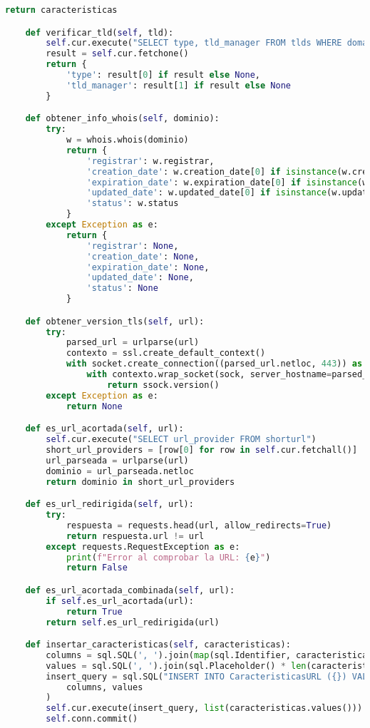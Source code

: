 \documentclass{article}
\begin{document}
\begin{lstlisting}[language=Python, caption=Clase para extraer características de URLs]
        return caracteristicas

    def verificar_tld(self, tld):
        self.cur.execute("SELECT type, tld_manager FROM tlds WHERE domain = %s", ('.' + tld,))
        result = self.cur.fetchone()
        return {
            'type': result[0] if result else None,
            'tld_manager': result[1] if result else None
        }

    def obtener_info_whois(self, dominio):
        try:
            w = whois.whois(dominio)
            return {
                'registrar': w.registrar,
                'creation_date': w.creation_date[0] if isinstance(w.creation_date, list) else w.creation_date,
                'expiration_date': w.expiration_date[0] if isinstance(w.expiration_date, list) else w.expiration_date,
                'updated_date': w.updated_date[0] if isinstance(w.updated_date, list) else w.updated_date,
                'status': w.status
            }
        except Exception as e:
            return {
                'registrar': None,
                'creation_date': None,
                'expiration_date': None,
                'updated_date': None,
                'status': None
            }

    def obtener_version_tls(self, url):
        try:
            parsed_url = urlparse(url)
            contexto = ssl.create_default_context()
            with socket.create_connection((parsed_url.netloc, 443)) as sock:
                with contexto.wrap_socket(sock, server_hostname=parsed_url.netloc) as ssock:
                    return ssock.version()
        except Exception as e:
            return None

    def es_url_acortada(self, url):
        self.cur.execute("SELECT url_provider FROM shorturl")
        short_url_providers = [row[0] for row in self.cur.fetchall()]
        url_parseada = urlparse(url)
        dominio = url_parseada.netloc
        return dominio in short_url_providers

    def es_url_redirigida(self, url):
        try:
            respuesta = requests.head(url, allow_redirects=True)
            return respuesta.url != url
        except requests.RequestException as e:
            print(f"Error al comprobar la URL: {e}")
            return False

    def es_url_acortada_combinada(self, url):
        if self.es_url_acortada(url):
            return True
        return self.es_url_redirigida(url)

    def insertar_caracteristicas(self, caracteristicas):
        columns = sql.SQL(', ').join(map(sql.Identifier, caracteristicas.keys()))
        values = sql.SQL(', ').join(sql.Placeholder() * len(caracteristicas))
        insert_query = sql.SQL("INSERT INTO CaracteristicasURL ({}) VALUES ({})").format(
            columns, values
        )
        self.cur.execute(insert_query, list(caracteristicas.values()))
        self.conn.commit()


\end{lstlisting}
\end{document}
